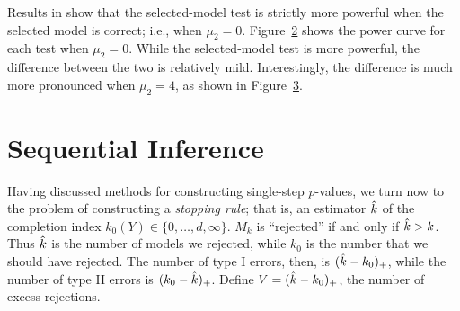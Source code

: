 \documentclass{article}
\begin{document}
\begin{figure}
  \centering
  \caption{}
  \label{fig:bv_rocCurve}
\end{figure}

Results in \citet{fithian2014optimal} show that the selected-model test is strictly more powerful when the selected model is correct; i.e., when $\mu_2=0$. Figure~\ref{fig:bv_powCurves_0} shows the power curve for each test when $\mu_2=0$. While the selected-model test is more powerful, the difference between the two is relatively mild. Interestingly, the difference is much more pronounced when $\mu_2=4$, as shown in Figure~\ref{fig:bv_powCurves_4}.

\begin{figure}
  \centering
  \begin{subfigure}[t]{.4\textwidth}
    \caption{}
    \label{fig:bv_powCurves_0}
  \end{subfigure}
  \hspace{.1\textwidth}
  \begin{subfigure}[t]{.4\textwidth}
    \caption{}
  \end{subfigure}
  \caption{}
   \label{fig:bv_powCurves_4}
\end{figure}



\section{Sequential Inference}

Having discussed methods for constructing single-step $p$-values, we turn now to the problem of constructing a {\em stopping rule}; that is, an estimator $\hat{k}$ of the completion index $k_0(Y)\in \{0,\ldots,d,\infty\}$. $M_k$ is ``rejected'' if and only if $\hat{k}>k$. Thus $\hat{k}$ is the number of models we rejected, while $k_0$ is the number that we should have rejected. The number of type I errors, then, is $(\hat{k}-k_0)_+$, while the number of type II errors is $(k_0-\hat{k})_+$. Define $V=(\hat{k}-k_0)_+$, the number of excess rejections.
\end{document}
